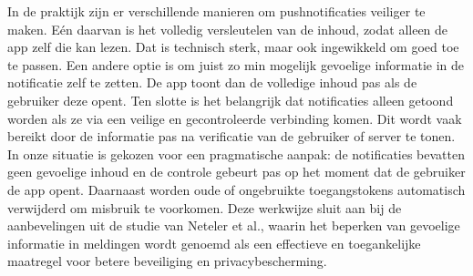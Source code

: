 In de praktijk zijn er verschillende manieren om pushnotificaties veiliger te maken. Eén daarvan is het volledig versleutelen van de inhoud, zodat alleen de app zelf die kan lezen. Dat is technisch sterk, maar ook ingewikkeld om goed toe te passen. Een andere optie is om juist zo min mogelijk gevoelige informatie in de notificatie zelf te zetten. De app toont dan de volledige inhoud pas als de gebruiker deze opent. Ten slotte is het belangrijk dat notificaties alleen getoond worden als ze via een veilige en gecontroleerde verbinding komen. Dit wordt vaak bereikt door de informatie pas na verificatie van de gebruiker of server te tonen.\\

In onze situatie is gekozen voor een pragmatische aanpak: de notificaties bevatten geen gevoelige inhoud en de controle gebeurt pas op het moment dat de gebruiker de app opent. Daarnaast worden oude of ongebruikte toegangstokens automatisch verwijderd om misbruik te voorkomen. Deze werkwijze sluit aan bij de aanbevelingen uit de studie van Neteler et al., waarin het beperken van gevoelige informatie in meldingen wordt genoemd als een effectieve en toegankelijke maatregel voor betere beveiliging en privacybescherming\autocite{Neteler2024}.\\



